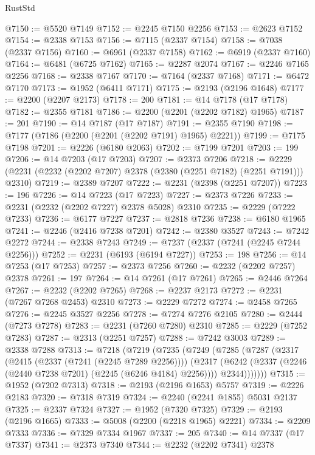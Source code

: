\begin{lexlean}{RustStd}
\begin{coremodule}
@7150 := @5520 @7149
@7152 := @2245 @7150 @2256
@7153 := @2623 @7152
@7154 := @2338 @7153
@7156 := @7115 (@2337 @7154)
@7158 := @7038 (@2337 @7156)
@7160 := @6961 (@2337 @7158)
@7162 := @6919 (@2337 @7160)
@7164 := @6481 (@6725 @7162)
@7165 := @2287 @2074
@7167 := @2246 @7165 @2256
@7168 := @2338 @7167
@7170 := @7164 (@2337 @7168)
@7171 := @6472 @7170
@7173 := @1952 (@6411 @7171)
@7175 := @2193 (@2196 @1648)
@7177 := @2200 (@2207 @2173)
@7178 := 200
@7181 := @14 @7178 (@17 @7178)
@7182 := @2355 @7181
@7186 := @2200 (@2201 (@2202 @7182) @1965)
@7187 := 201
@7190 := @14 @7187 (@17 @7187)
@7191 := @2355 @7190
@7198 := @7177 (@7186 (@2200 (@2201 (@2202 @7191) @1965) @2221))
@7199 := @7175 @7198
@7201 := @2226 (@6180 @2063)
@7202 := @7199 @7201
@7203 := 199
@7206 := @14 @7203 (@17 @7203)
@7207 := @2373 @7206
@7218 := @2229 (@2231 (@2232 (@2202 @7207) @2378 (@2380 (@2251 @7182) (@2251 @7191))) @2310)
@7219 := @2389 @7207
@7222 := @2231 (@2398 (@2251 @7207))
@7223 := 196
@7226 := @14 @7223 (@17 @7223)
@7227 := @2373 @7226
@7233 := @2231 (@2232 (@2202 @7227) @2378 @5028) @2310
@7235 := @2229 (@7222 @7233)
@7236 := @6177 @7227
@7237 := @2818 @7236
@7238 := @6180 @1965
@7241 := @2246 (@2416 @7238 @7201)
@7242 := @2380 @3527
@7243 := @7242 @2272
@7244 := @2338 @7243
@7249 := @7237 (@2337 (@7241 (@2245 @7244 @2256)))
@7252 := @2231 (@6193 (@6194 @7227))
@7253 := 198
@7256 := @14 @7253 (@17 @7253)
@7257 := @2373 @7256
@7260 := @2232 (@2202 @7257) @2378
@7261 := 197
@7264 := @14 @7261 (@17 @7261)
@7265 := @2446 @7264
@7267 := @2232 (@2202 @7265)
@7268 := @2237 @2173
@7272 := @2231 (@7267 @7268 @2453) @2310
@7273 := @2229 @7272
@7274 := @2458 @7265
@7276 := @2245 @3527 @2256
@7278 := @7274 @7276 @2105
@7280 := @2444 (@7273 @7278)
@7283 := @2231 (@7260 @7280) @2310
@7285 := @2229 (@7252 @7283)
@7287 := @2313 (@2251 @7257)
@7288 := @7242 @3003
@7289 := @2338 @7288
@7313 := @7218
    (@7219
      (@7235
        (@7249
          (@7285
            (@7287
              (@2317
                (@2415 (@2337 (@7241 (@2245 @7289 @2256))))
                (@2317
                  (@6242 (@2337 (@2246 (@2440 @7238 @7201) (@2245 (@6246 @4184) @2256))))
                  @2344)))))))
@7315 := @1952 (@7202 @7313)
@7318 := @2193 (@2196 @1653) @5757
@7319 := @2226 @2183
@7320 := @7318 @7319
@7324 := @2240 (@2241 @1855) @5031 @2137
@7325 := @2337 @7324
@7327 := @1952 (@7320 @7325)
@7329 := @2193 (@2196 @1665)
@7333 := @5008 (@2200 (@2218 @1965) @2221)
@7334 := @2209 @7333
@7336 := @7329 @7334 @1967
@7337 := 205
@7340 := @14 @7337 (@17 @7337)
@7341 := @2373 @7340
@7344 := @2232 (@2202 @7341) @2378

\end{coremodule}
\end{lexlean}
